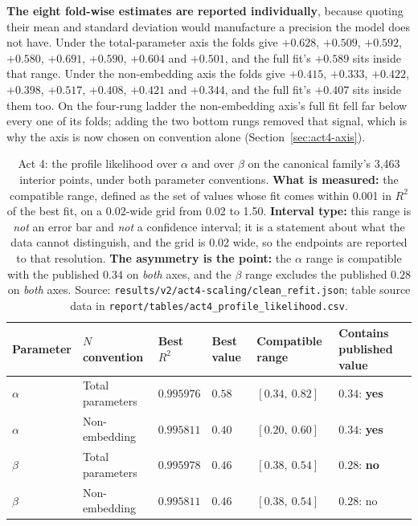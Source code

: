 \documentclass[11pt,a4paper]{article}
\begin{document}
\textbf{The eight fold-wise estimates are reported individually}, because
quoting their mean and standard deviation would manufacture a precision the
model does not have. Under the total-parameter axis the folds give $+0.628$,
$+0.509$, $+0.592$, $+0.580$, $+0.691$, $+0.590$, $+0.604$ and $+0.501$, and
the full fit's $+0.589$ sits inside that range. Under the non-embedding axis
the folds give $+0.415$, $+0.333$, $+0.422$, $+0.398$, $+0.517$, $+0.408$,
$+0.421$ and $+0.344$, and the full fit's $+0.407$ sits inside them too. On
the four-rung ladder the non-embedding axis's full fit fell far below every
one of its folds; adding the two bottom rungs removed that signal, which is
why the axis is now chosen on convention alone
(Section~\ref{sec:act4-axis}). %

\begin{table}[H]
\centering
\begin{tabular}{L{1.6cm}L{3.4cm}R{2.0cm}R{2.2cm}R{2.4cm}R{1.6cm}}
\toprule
Parameter & $N$ convention & Best $R^2$ & Best value & Compatible range &
Contains published value \\
\midrule
$\alpha$ & Total parameters & $0.995976$ & $0.58$ & $[0.34,\ 0.82]$ &
$0.34$: \textbf{yes} \\
$\alpha$ & Non-embedding & $0.995811$ & $0.40$ & $[0.20,\ 0.60]$ &
$0.34$: \textbf{yes} \\
$\beta$ & Total parameters & $0.995978$ & $0.46$ & $[0.38,\ 0.54]$ &
$0.28$: \textbf{no} \\
$\beta$ & Non-embedding & $0.995811$ & $0.46$ & $[0.38,\ 0.54]$ &
$0.28$: no \\
\bottomrule
\end{tabular}
\caption{Act 4: the profile likelihood over $\alpha$ and over $\beta$ on the
canonical family's 3,463 interior points, under both parameter conventions.
\textbf{What is measured:} the compatible range, defined as the set of values
whose fit comes within 0.001 in $R^2$ of the best fit, on a 0.02-wide grid
from 0.02 to 1.50. \textbf{Interval type:} this range is \emph{not} an error
bar and \emph{not} a confidence interval; it is a statement about what the data
cannot distinguish, and the grid is 0.02 wide, so the endpoints are reported
to that resolution. \textbf{The asymmetry is the point:} the $\alpha$ range is
compatible with the published $0.34$ on \emph{both} axes, and the $\beta$
range excludes the published $0.28$ on \emph{both} axes. Source:
\texttt{results/v2/act4-scaling/clean\_refit.json}; table source data in
\texttt{report/tables/act4\_profile\_likelihood.csv}.}
\label{tab:act4-profile}
\end{table}
\end{document}
